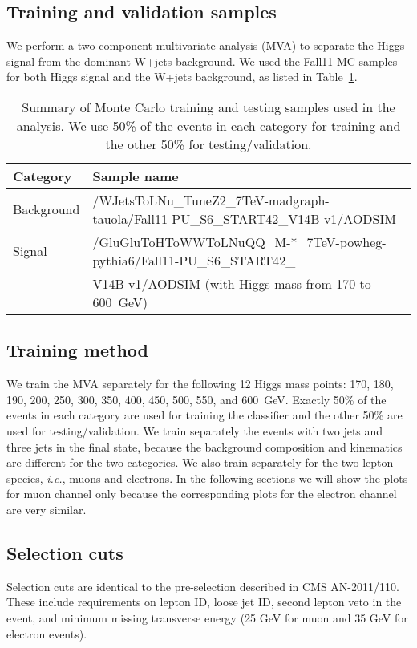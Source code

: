 \subsection{Training and validation samples}
We perform a two-component multivariate analysis (MVA) to 
separate the Higgs signal from the dominant W+jets background.
We used the Fall11 MC samples for both Higgs signal and the 
W+jets background, as listed in Table~\ref{tab:MCsamples}.
\begin{table}[htb]
  \begin{center}
    \begin{tabular}{l|l} 
      \hline
       Category & Sample name\\
      \hline
      Background & {\footnotesize /WJetsToLNu\_TuneZ2\_7TeV-madgraph-tauola/Fall11-PU\_S6\_START42\_V14B-v1/AODSIM}  \\
      \hline
      Signal &  {\footnotesize /GluGluToHToWWToLNuQQ\_M-*\_7TeV-powheg-pythia6/Fall11-PU\_S6\_START42\_}\\
       &  {\footnotesize V14B-v1/AODSIM} (with Higgs mass from 170 to 600~GeV) \\
      \hline
    \end{tabular}
  \end{center}
  \caption{Summary of Monte Carlo training and testing samples used in the analysis. 
    We use 50\% of the events in each category for training and the other 50\% for testing/validation.}
  \label{tab:MCsamples}
\end{table}

\subsection{Training method}
We train the MVA separately for the following 12 Higgs mass 
points: 170, 180, 190, 200, 250, 300, 350, 400, 450, 500, 550, and 600~GeV.
Exactly 50\% of the events in each category are used for training 
the classifier and the other 50\% are used for testing/validation.
We train separately the events with two jets 
and three jets in the final state, because the background composition 
and kinematics are different for the two categories.
We also train separately for the two lepton species, \textit{i.e.}, 
muons and electrons.
In the following sections we will show the plots for muon channel 
only because the corresponding plots for the electron channel are 
very similar.


\subsection{Selection cuts}
Selection cuts are identical to the pre-selection described in 
CMS AN-2011/110. These include requirements on lepton ID, loose 
jet ID, second lepton veto in the event, and minimum missing transverse 
energy (25 GeV for muon and 35 GeV for electron events). 

